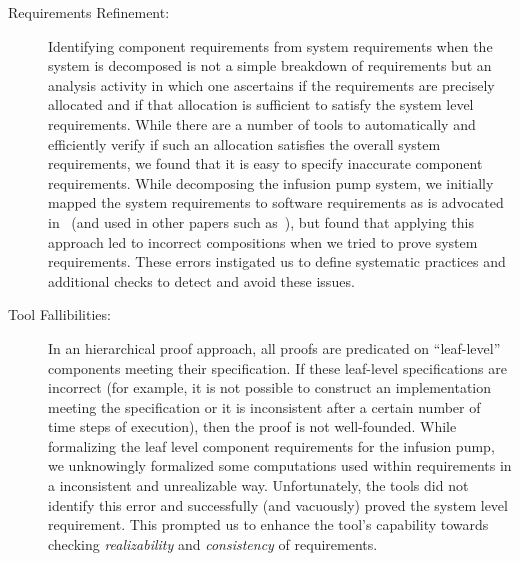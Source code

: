 \begin{description}
    \item[Requirements Refinement:] Identifying component requirements from system requirements when the system is decomposed is not a simple breakdown of requirements but an analysis activity in which one ascertains if the requirements are precisely allocated and if that allocation is sufficient to satisfy the system level requirements. While there are a number of tools to automatically and efficiently verify if such an allocation satisfies the overall system requirements, we found that it is easy to specify inaccurate component requirements. While decomposing the infusion pump system, we initially mapped the system requirements to software requirements as is advocated in~\cite{Miller01:dasc} (and used in other papers such as~\cite{Jeffords:2010:MCV:1938390.1938407,Kauppinen07:re}), but found that applying this approach led to incorrect compositions when we tried to prove system requirements. These errors instigated us to define systematic practices and additional checks to detect and avoid these issues.
    \item[Tool Fallibilities:] In an hierarchical proof approach, all proofs are predicated on ``leaf-level'' components meeting their specification.  If these leaf-level specifications are incorrect (for example, it is not possible to construct an implementation meeting the specification or it is inconsistent after a certain number of time steps of execution), then the proof is not well-founded. While formalizing the leaf level component requirements for the infusion pump, we unknowingly formalized some computations used within requirements in a inconsistent and unrealizable way. Unfortunately, the tools did not identify this error and successfully (and vacuously) proved the system level requirement. This prompted us to enhance the tool's capability towards checking {\em realizability} and {\em consistency} of requirements.

\end{description}
